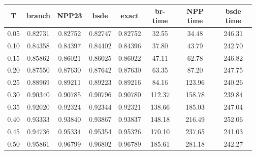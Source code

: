 \begin{tabular}{cccccccc}
\toprule
T & branch & NPP23 & bsde & exact & br-time & NPP time & bsde time \\
\midrule
0.05 & 0.82731 & 0.82752 & 0.82747 & 0.82752 & 32.55 & 34.48 & 246.31 \\
0.10 & 0.84358 & 0.84397 & 0.84402 & 0.84396 & 37.80 & 43.79 & 242.70 \\
0.15 & 0.85862 & 0.86021 & 0.86025 & 0.86022 & 47.11 & 62.78 & 246.82 \\
0.20 & 0.87550 & 0.87630 & 0.87642 & 0.87630 & 63.35 & 87.20 & 247.75 \\
0.25 & 0.88969 & 0.89211 & 0.89223 & 0.89216 & 84.16 & 123.96 & 240.26 \\
0.30 & 0.90340 & 0.90785 & 0.90796 & 0.90780 & 112.37 & 158.78 & 239.84 \\
0.35 & 0.92020 & 0.92324 & 0.92344 & 0.92321 & 138.66 & 185.03 & 247.04 \\
0.40 & 0.93333 & 0.93840 & 0.93867 & 0.93837 & 148.18 & 216.49 & 252.06 \\
0.45 & 0.94736 & 0.95334 & 0.95354 & 0.95326 & 170.10 & 237.65 & 241.03 \\
0.50 & 0.95861 & 0.96799 & 0.96802 & 0.96789 & 185.61 & 281.18 & 242.27 \\
\bottomrule
\end{tabular}
